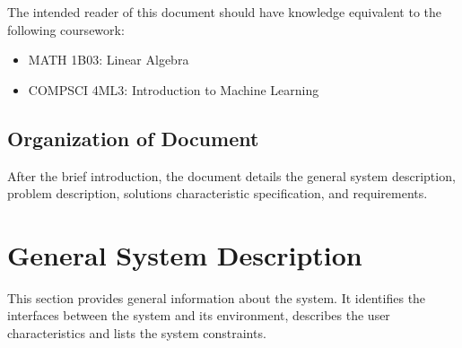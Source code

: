 \documentclass[12pt]{article}
\begin{document}
The intended reader of this document should have knowledge equivalent to the
following coursework:

\begin{itemize}
  \item MATH 1B03: Linear Algebra
  \item COMPSCI 4ML3: Introduction to Machine Learning
\end{itemize}



\subsection{Organization of Document}

After the brief introduction, the document details the general system
description, problem description, solutions characteristic specification, and
requirements.


\section{General System Description}

This section provides general information about the system.  It identifies the
interfaces between the system and its environment, describes the user
characteristics and lists the system constraints.
\end{document}

